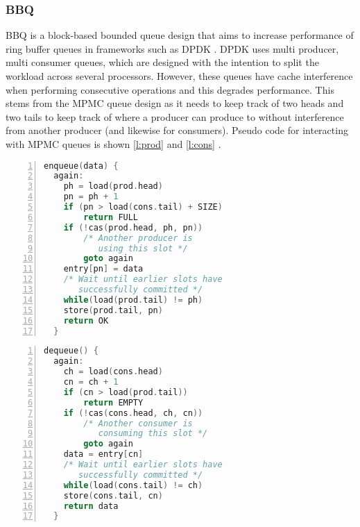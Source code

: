 \subsubsection{BBQ}
BBQ is a block-based bounded queue design that aims to increase performance of ring buffer queues in frameworks such
as DPDK \cite{Wang_BFOOLCHC_22}. DPDK uses multi producer, multi consumer queues, which are designed with the
intention to split the workload across several processors. However, these queues have cache interference when
performing consecutive operations and this degrades performance. This stems from the MPMC queue design as it needs to keep track of
two heads and two tails to keep track of where a producer can produce to without interference from another producer (and
likewise for consumers). Pseudo code for interacting with MPMC queues is shown \autoref{l:prod} and \autoref{l:cons} 
\cite{Wang_BFOOLCHC_22}.

\noindent\begin{minipage}{.45\textwidth}
\fontsmall
\begin{lstlisting}[numbers=left, tabsize=2, language=C, caption={Producer pseudo code},frame=tb, label={l:prod}, captionpos=b]
  enqueue(data) {
  again:
  	ph = load(prod.head)
  	pn = ph + 1
  	if (pn > load(cons.tail) + SIZE)
  		return FULL
  	if (!cas(prod.head, ph, pn))
  		/* Another producer is 
  		   using this slot */
  		goto again
  	entry[pn] = data
  	/* Wait until earlier slots have
  	   successfully committed */
  	while(load(prod.tail) != ph)
  	store(prod.tail, pn)
  	return OK
  }
\end{lstlisting} 
\end{minipage}\hfill
\begin{minipage}{.45\textwidth}
\fontsmall
\begin{lstlisting}[numbers=left, tabsize=2, language=C, caption={Consumer pseudo code},frame=tb, label={l:cons}, captionpos=b]
  dequeue() {
  again:
  	ch = load(cons.head)
  	cn = ch + 1
  	if (cn > load(prod.tail))
  		return EMPTY
  	if (!cas(cons.head, ch, cn))
  		/* Another consumer is 
  		   consuming this slot */
  		goto again
  	data = entry[cn]
  	/* Wait until earlier slots have 
       successfully committed */
  	while(load(cons.tail) != ch)
  	store(cons.tail, cn)
  	return data
  }
\end{lstlisting}
\end{minipage}

